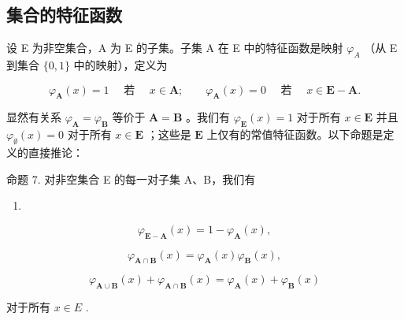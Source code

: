 \subsection{集合的特征函数}

设 E 为非空集合，A 为 E 的子集。子集 A 在 E 中的特征函数是映射 \(\varphi_{A}\) （从 E 到集合 \(\{0, 1\}\) 中的映射），定义为

\[
\varphi_ {\mathbf {A}} (x) = 1 \quad \text { 若 } \quad x \in \mathbf {A}; \qquad \varphi_ {\mathbf {A}} (x) = 0 \quad \text { 若 } \quad x \in \mathbf {E} - \mathbf {A}.
\]

显然有关系 \(\varphi_{\mathbf{A}} = \varphi_{\mathbf{B}}\) 等价于 \(\mathbf{A} = \mathbf{B}\) 。我们有 \(\varphi_{\mathbf{E}}(x) = 1\) 对于所有 \(x \in \mathbf{E}\) 并且 \(\varphi_{\emptyset}(x) = 0\) 对于所有 \(x \in \mathbf{E}\) ；这些是 \(\mathbf{E}\) 上仅有的常值特征函数。以下命题是定义的直接推论：

命题 7. 对非空集合 E 的每一对子集 A、B，我们有

\begin{enumerate}
\def\labelenumi{(\arabic{enumi})}
\tightlist
\item
\end{enumerate}

\[
\varphi_ {\mathbf {E} - \mathbf {A}} (x) = 1 - \varphi_ {\mathbf {A}} (x),\tag{2}
\]

\[
\varphi_ {\mathbf {A} \cap \mathbf {B}} (x) = \varphi_ {\mathbf {A}} (x) \varphi_ {\mathbf {B}} (x),\tag{3}
\]

\[
\varphi_ {\mathbf {A} \cup \mathbf {B}} (x) + \varphi_ {\mathbf {A} \cap \mathbf {B}} (x) = \varphi_ {\mathbf {A}} (x) + \varphi_ {\mathbf {B}} (x)
\]

对于所有 \(x \in E\) .

